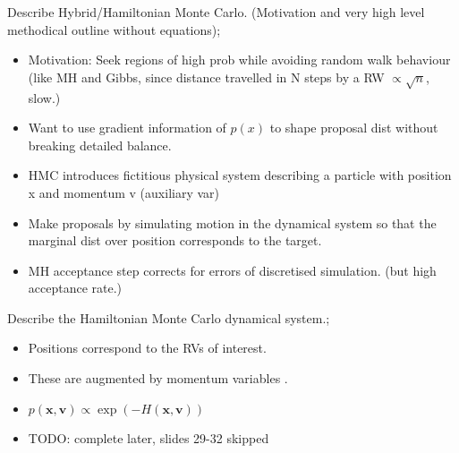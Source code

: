 \documentclass{article}
\begin{document}
Describe Hybrid/Hamiltonian Monte Carlo. (Motivation and very high level methodical outline without equations); \begin{itemize}
    \item Motivation: Seek regions of high prob while avoiding random walk behaviour (like MH and Gibbs, since distance travelled in N steps by a RW $\propto \sqrt{n}$, slow.)
    \item Want to use gradient information of $p(x)$ to shape proposal dist without breaking detailed balance.
    \item HMC introduces fictitious physical system describing a particle with position x and momentum v (auxiliary var)
    \item Make proposals by simulating motion in the dynamical system so that the marginal dist over position corresponds to the target.
    \item MH acceptance step corrects for errors of discretised simulation. (but high acceptance rate.)
\end{itemize}

Describe the Hamiltonian Monte Carlo dynamical system.; \begin{itemize}
    \item Positions  correspond to the RVs of interest. 
    \item These are augmented by momentum variables .
    \item $p(\mathbf{x, v})\propto \exp(-H(\mathbf{x, v}))$
    \item TODO: complete later, slides 29-32 skipped
\end{itemize}

\end{document}
